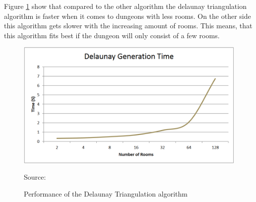 \documentclass[a4paper,12pt,oneside]{scrreprt}
\begin{document}
Figure \ref{fig:delaunay_performance} show that compared to the other algorithm the delaunay triangulation algorithm is faster when it comes to dungeons with less rooms. On the other side this algorithm gets slower with the increasing amount of rooms. This means, that this algorithm fits best if the dungeon will only consist of a few rooms.
\begin{figure}[htb]
\centering
\includegraphics[scale=0.5]{images/delaunay_performance.png} 
\caption{Performance of the Delaunay Triangulation algorithm}
Source: \cite[][]{williams_investigation_nodate}
\label{fig:delaunay_performance}
\end{figure}

\clearpage
{}
{}
\listoffigures

\clearpage
{}
{}
\printbibliography
\end{document}
